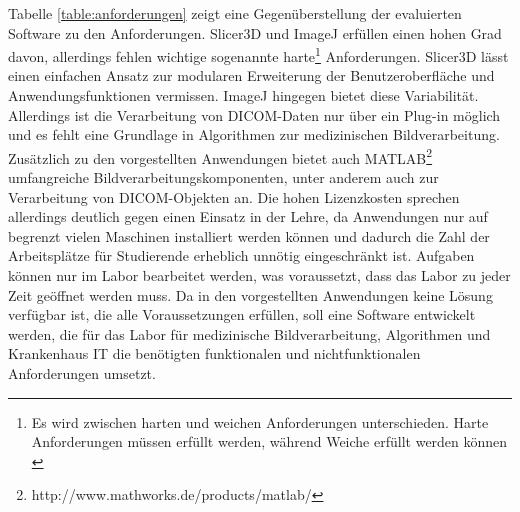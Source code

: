 Tabelle \ref{table:anforderungen} zeigt eine Gegenüberstellung der evaluierten Software zu den Anforderungen. Slicer3D und ImageJ erfüllen einen hohen Grad davon, allerdings fehlen wichtige sogenannte harte\footnote{Es wird zwischen harten und weichen Anforderungen unterschieden. Harte Anforderungen müssen erfüllt werden, während Weiche erfüllt werden können \cite[9]{balzert:swa}} Anforderungen. Slicer3D lässt einen einfachen Ansatz zur modularen Erweiterung der Benutzeroberfläche und Anwendungsfunktionen vermissen. ImageJ hingegen bietet diese Variabilität. Allerdings ist die Verarbeitung von DICOM-Daten nur über ein Plug-in möglich und es fehlt eine Grundlage in Algorithmen zur medizinischen Bildverarbeitung. Zusätzlich zu den vorgestellten Anwendungen bietet auch MATLAB\footnote{http://www.mathworks.de/products/matlab/} umfangreiche Bildverarbeitungskomponenten, unter anderem auch zur Verarbeitung von DICOM-Objekten an. Die hohen Lizenzkosten sprechen allerdings deutlich gegen einen Einsatz in der Lehre, da Anwendungen nur auf begrenzt vielen Maschinen installiert werden können und dadurch die Zahl der Arbeitsplätze für Studierende erheblich unnötig eingeschränkt ist. Aufgaben können nur im Labor bearbeitet werden, was voraussetzt, dass das Labor zu jeder Zeit geöffnet werden muss.
Da in den vorgestellten Anwendungen keine Lösung verfügbar ist, die alle Voraussetzungen erfüllen, soll eine Software entwickelt werden, die für das Labor für medizinische Bildverarbeitung, Algorithmen und Krankenhaus IT die benötigten funktionalen und nichtfunktionalen Anforderungen umsetzt.